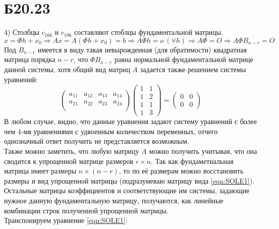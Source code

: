 \section*{Б20.23}4)
Столбцы $c_{166}$ и $c_{196}$ составляют стоблцы фундаментальной матрицы.
$$x=\Phi h + x_0\Rightarrow Ax=A(\Phi h + x_0)=b\Rightarrow A\Phi h=o\ (\forall h)\Rightarrow A\Phi=O\Rightarrow A\Phi B_{n-r}=O$$
Под $B_{n-r}$ имеется в виду такая невырожденная (для обратимости) квадратная матрица порядка $n-r$, что $\Phi B_{n-r}$ равна нормальной фундаментальной матрице данной системы, хотя общий вид матриц $A$ задается также решением системы уравнений:
\begin{equation}
    \begin{pmatrix*}
a_{11}&a_{12}&a_{13}&a_{14}\\
a_{21}&a_{22}&a_{23}&a_{24}\\
\end{pmatrix*}\begin{pmatrix*}
1&1\\
1&2\\
1&1\\
1&3
\end{pmatrix*}=\begin{pmatrix*}
0&0\\
0&0
\end{pmatrix*}
\label{eqn:SOLE1}
\end{equation}
В любом случае, видно, что данные уравнения задают систему уравнений с более чем 4-мя уравнениями с удвоенным количеством переменных, отчего однозначный ответ получить не представляется возможным.\\
Также можно заметить, что любую матрицу $A$ можно получить учитывая, что она сводится к упрощенной матрице размеров $r\times n$. Так как фундаметнальная матрица имеет размеры $n\times(n-r)$, то по её размерам можно восстановить размеры и вид упрощенной матрицы (подразумеваю матрицу вида \eqref{eqn:SOLE1}). Остальные матрицы коэффициентов и соответствующие им системы, задающие нужное данную фундаментальную матрицу, получаются, как линейные комбинации строк полученной упрощенной матрицы.\\
Транспонируем уравнение \eqref{eqn:SOLE1}:
